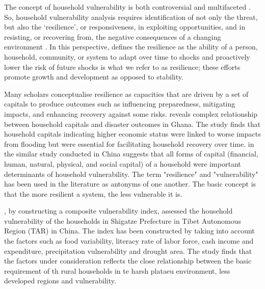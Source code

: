 \documentclass[12pt, a4paper]{article}
\begin{document}
The concept of household vulnerability is both controversial and multifaceted \citep{zhang2020capital}. So, household vulnerability analysis requires identification of not only the threat, but also the ‘resilience’, or responsiveness, in exploiting opportunities, and in resisting, or recovering from, the negative consequences of a changing environment \citep{moser1998asset}. In this perspective, \cite{bernier2014resilience} defines the resilience as the ability of a person, household, community, or system to adapt over time to shocks and proactively lower the risk of future shocks is what we refer to as resilience; these efforts promote growth and development as opposed to stability.

Many scholars conceptualise resilience as capacities that are driven by a set of capitals to produce outcomes such as influencing preparedness, mitigating impacts, and enhancing recovery against some risks. \cite{gaisie2021complexity} reveals complex relationship between household capitals and disaster outcomes in Ghana. The study finds that household capitals indicating higher economic status were linked to worse impacts from flooding but were essential for facilitating household recovery over time. \cite{zhang2020capital} in the similar study conducted in China suggests that all forms of capital (financial, human, natural, physical, and social 
capital) of a household were important determinants of household vulnerability. The term "resilience" and "vulnerability" has been used in the literature as antonyms of one another. The basic concept is that the more resilient a system, the less vulnerable it is. 

\cite{fang2016rural}, by constructing a composite vulnerability index, assessed the household vulnerability of the households in Shigatze Prefecture in Tibet
Autonomous Region (TAR) in China. The index has been constructed by taking into account the factors such as food variability, literacy rate of labor force, cash income and expenditure, precipitation vulnerability and drought area. The study finds that the factors under consideration reflects the close relationship between the basic requirement of th rural households in te harsh plataeu environment, less developed regions and vulnerability.    
\end{document}
